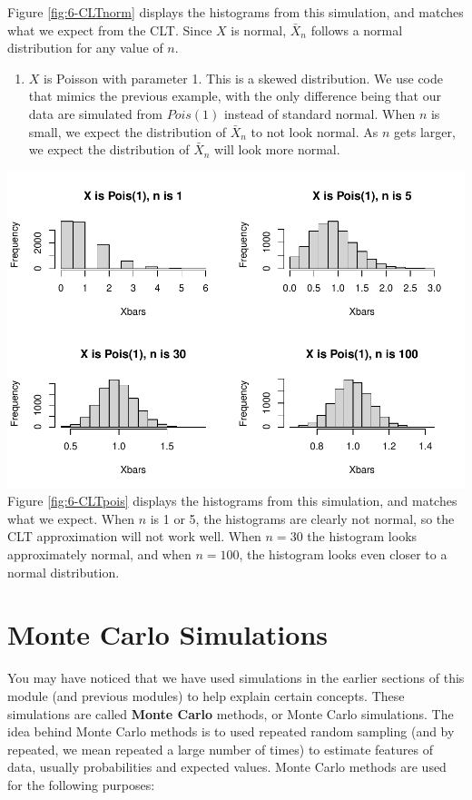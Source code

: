 \documentclass[
]{book}
\providecommand{\tightlist}{%
  \setlength{\itemsep}{0pt}\setlength{\parskip}{0pt}}
\begin{document}
Figure \ref{fig:6-CLTnorm} displays the histograms from this simulation, and matches what we expect from the CLT. Since \(X\) is normal, \(\bar{X}_n\) follows a normal distribution for any value of \(n\).

\begin{enumerate}
\def\labelenumi{\arabic{enumi}.}
\setcounter{enumi}{1}
\tightlist
\item
  \(X\) is Poisson with parameter 1. This is a skewed distribution. We use code that mimics the previous example, with the only difference being that our data are simulated from \(Pois(1)\) instead of standard normal. When \(n\) is small, we expect the distribution of \(\bar{X}_n\) to not look normal. As \(n\) gets larger, we expect the distribution of \(\bar{X}_n\) will look more normal.
\end{enumerate}

\includegraphics{bookdown-demo_files/figure-latex/6-CLTpois-1.pdf}
Figure \ref{fig:6-CLTpois} displays the histograms from this simulation, and matches what we expect. When \(n\) is 1 or 5, the histograms are clearly not normal, so the CLT approximation will not work well. When \(n=30\) the histogram looks approximately normal, and when \(n=100\), the histogram looks even closer to a normal distribution.

\section{Monte Carlo Simulations}\label{monte-carlo-simulations}

You may have noticed that we have used simulations in the earlier sections of this module (and previous modules) to help explain certain concepts. These simulations are called \textbf{Monte Carlo} methods, or Monte Carlo simulations. The idea behind Monte Carlo methods is to used repeated random sampling (and by repeated, we mean repeated a large number of times) to estimate features of data, usually probabilities and expected values. Monte Carlo methods are used for the following purposes:
\end{document}
